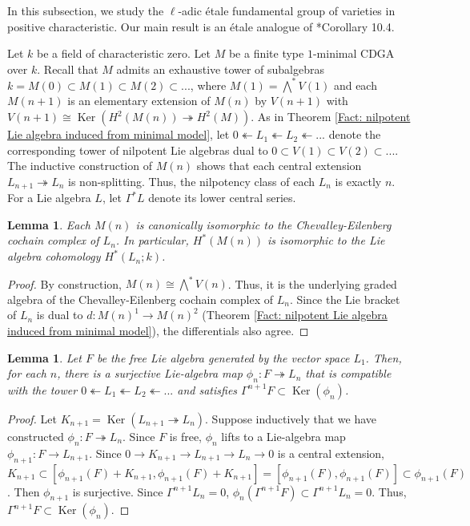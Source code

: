\documentclass[11pt]{amsart}
\newtheorem{lemma}[theorem]{Lemma}
\theoremstyle{definition}
\numberwithin{equation}{section}
\numberwithin{equation}{section}
\DeclareMathOperator{\Ker}{Ker}
\begin{document}
In this subsection, we study the $\ell$-adic \'etale fundamental group of varieties in positive characteristic. Our main result is an \'etale analogue of \cite{Morgan-hodge-theory}*{Corollary 10.4}.

Let $k$ be a field of characteristic zero. Let $M$ be a finite type $1$-minimal CDGA over $k$. Recall that $M$ admits an exhaustive tower of subalgebras $k=M(0)\subset M(1)\subset M(2)\subset ...$, where $M(1)=\bigwedge^* V(1)$ and each $M(n+1)$ is an elementary extension of $M(n)$ by $V(n+1)$ with $V(n+1)\cong \Ker(H^2(M(n))\twoheadrightarrow H^2(M))$. As in Theorem \ref{Fact: nilpotent Lie algebra induced from minimal model}, let $0\twoheadleftarrow L_1\twoheadleftarrow L_2\twoheadleftarrow ...$ denote the corresponding tower of nilpotent Lie algebras dual to $0\subset V(1)\subset V(2)\subset ...$. The inductive construction of $M(n)$ shows that each central extension $L_{n+1}\twoheadrightarrow L_n$ is non-splitting. Thus, the nilpotency class of each $L_n$ is exactly $n$. For a Lie algebra $L$, let $\Gamma^*L$ denote its lower central series.

\begin{lemma}\label{Lem: Correspondence between Lie algebra cohomology and minimal model}
Each $M(n)$ is canonically isomorphic to the Chevalley-Eilenberg cochain complex of $L_n$. In particular, $H^*(M(n))$ is isomorphic to the Lie algebra cohomology $H^*(L_n;k)$.
\end{lemma}

\begin{proof}
By construction, $M(n)\cong \bigwedge^* V(n)$. Thus, it is the underlying graded algebra of the Chevalley-Eilenberg cochain complex of $L_n$. Since the Lie bracket of $L_n$ is dual to $d: M(n)^1\rightarrow M(n)^2$ (Theorem \ref{Fact: nilpotent Lie algebra induced from minimal model}), the differentials also agree.
\end{proof}

\begin{lemma}\label{Lem: More precise statement of Lie algebra tower of a 1-minimal model}
Let $F$ be the free Lie algebra generated by the vector space $L_1$. Then, for each $n$, there is a surjective Lie-algebra map $\phi_n:F\twoheadrightarrow L_n$ that is compatible with the tower $0\twoheadleftarrow L_1\twoheadleftarrow L_2\twoheadleftarrow ...$ and satisfies $\Gamma^{n+1}F\subset \Ker(\phi_n)$.
\end{lemma}

\begin{proof}
Let $K_{n+1}=\Ker(L_{n+1}\twoheadrightarrow L_n)$. Suppose inductively that we have constructed $\phi_n:F\twoheadrightarrow L_n$. Since $F$ is free, $\phi_n$ lifts to a Lie-algebra map $\phi_{n+1}:F\rightarrow L_{n+1}$. Since $0\rightarrow K_{n+1}\rightarrow L_{n+1}\rightarrow L_{n}\rightarrow 0$ is a central extension, $K_{n+1}\subset [\phi_{n+1}(F)+K_{n+1},\phi_{n+1}(F)+K_{n+1}]=[\phi_{n+1}(F),\phi_{n+1}(F)]\subset \phi_{n+1}(F)$. Then $\phi_{n+1}$ is surjective. Since $\Gamma^{n+1}L_n=0$, $\phi_n(\Gamma^{n+1}F)\subset \Gamma^{n+1}L_n=0$. Thus, $\Gamma^{n+1}F\subset \Ker(\phi_n)$.
\end{proof}
\end{document}
